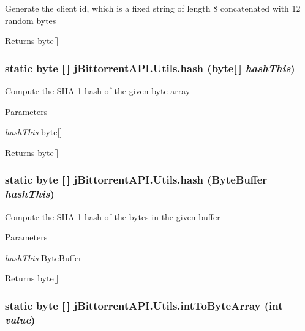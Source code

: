 \label{classj_bittorrent_a_p_i_1_1_utils_afffec79721b859efde246c770b7b8eef}
Generate the client id, which is a fixed string of length 8 concatenated with 12 random bytes \begin{DoxyReturn}{Returns}
byte\mbox{[}\mbox{]} 
\end{DoxyReturn}
\hypertarget{classj_bittorrent_a_p_i_1_1_utils_a755d6d5ea59374b5819a602d8c17e38d}{
\subsubsection[{hash}]{\setlength{\rightskip}{0pt plus 5cm}static byte \mbox{[}$\,$\mbox{]} jBittorrentAPI.Utils.hash (byte\mbox{[}$\,$\mbox{]} {\em hashThis})}}
\label{classj_bittorrent_a_p_i_1_1_utils_a755d6d5ea59374b5819a602d8c17e38d}
Compute the SHA-\/1 hash of the given byte array 
\begin{DoxyParams}{Parameters}
\item[{\em hashThis}]byte\mbox{[}\mbox{]} \end{DoxyParams}
\begin{DoxyReturn}{Returns}
byte\mbox{[}\mbox{]} 
\end{DoxyReturn}
\hypertarget{classj_bittorrent_a_p_i_1_1_utils_a91280c1132a48372fdf2d9f1f3e92561}{
\subsubsection[{hash}]{\setlength{\rightskip}{0pt plus 5cm}static byte \mbox{[}$\,$\mbox{]} jBittorrentAPI.Utils.hash (ByteBuffer {\em hashThis})}}
\label{classj_bittorrent_a_p_i_1_1_utils_a91280c1132a48372fdf2d9f1f3e92561}
Compute the SHA-\/1 hash of the bytes in the given buffer 
\begin{DoxyParams}{Parameters}
\item[{\em hashThis}]ByteBuffer \end{DoxyParams}
\begin{DoxyReturn}{Returns}
byte\mbox{[}\mbox{]} 
\end{DoxyReturn}
\hypertarget{classj_bittorrent_a_p_i_1_1_utils_a43e8192bb07c969b4ab77a2260f9f3c4}{
\subsubsection[{intToByteArray}]{\setlength{\rightskip}{0pt plus 5cm}static byte \mbox{[}$\,$\mbox{]} jBittorrentAPI.Utils.intToByteArray (int {\em value})}}
